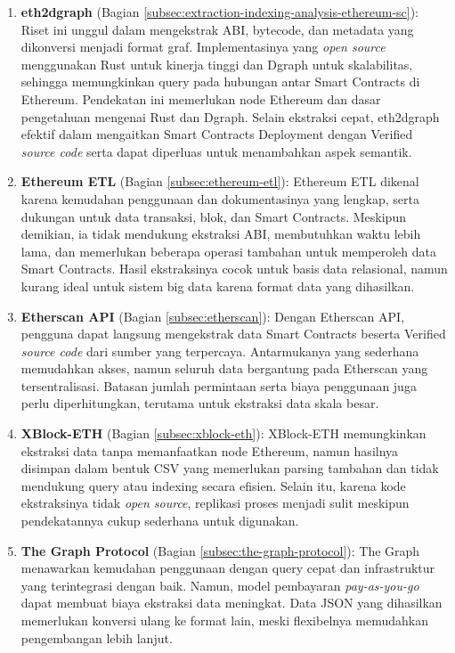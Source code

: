 \begin{enumerate}
	\item \textbf{eth2dgraph} \parencite{aimar2023extraction} (Bagian \ref{subsec:extraction-indexing-analysis-ethereum-sc}): Riset ini unggul dalam mengekstrak ABI, bytecode, dan metadata yang dikonversi menjadi format graf. Implementasinya yang \textit{open source} menggunakan Rust untuk kinerja tinggi dan Dgraph untuk skalabilitas, sehingga memungkinkan query pada hubungan antar Smart Contracts di Ethereum. Pendekatan ini memerlukan node Ethereum dan dasar pengetahuan mengenai Rust dan Dgraph. Selain ekstraksi cepat, eth2dgraph efektif dalam mengaitkan Smart Contracts Deployment dengan Verified \textit{source code} serta dapat diperluas untuk menambahkan aspek semantik.

	\item \textbf{Ethereum ETL} \parencite{ethereum_etl} (Bagian \ref{subsec:ethereum-etl}): Ethereum ETL dikenal karena kemudahan penggunaan dan dokumentasinya yang lengkap, serta dukungan untuk data transaksi, blok, dan Smart Contracts. Meskipun demikian, ia tidak mendukung ekstraksi ABI, membutuhkan waktu lebih lama, dan memerlukan beberapa operasi tambahan untuk memperoleh data Smart Contracts. Hasil ekstraksinya cocok untuk basis data relasional, namun kurang ideal untuk sistem big data karena format data yang dihasilkan.

	\item \textbf{Etherscan API} \parencite{etherscan2024} (Bagian \ref{subsec:etherscan}): Dengan Etherscan API, pengguna dapat langsung mengekstrak data Smart Contracts beserta Verified \textit{source code} dari sumber yang terpercaya. Antarmukanya yang sederhana memudahkan akses, namun seluruh data bergantung pada Etherscan yang tersentralisasi. Batasan jumlah permintaan serta biaya penggunaan juga perlu diperhitungkan, terutama untuk ekstraksi data skala besar.

	\item \textbf{XBlock-ETH} \parencite{zheng2020xblock} (Bagian \ref{subsec:xblock-eth}): XBlock-ETH memungkinkan ekstraksi data tanpa memanfaatkan node Ethereum, namun hasilnya disimpan dalam bentuk CSV yang memerlukan parsing tambahan dan tidak mendukung query atau indexing secara efisien. Selain itu, karena kode ekstraksinya tidak \textit{open source}, replikasi proses menjadi sulit meskipun pendekatannya cukup sederhana untuk digunakan.

	\item \textbf{The Graph Protocol} \parencite{TheGraphDocs} (Bagian \ref{subsec:the-graph-protocol}): The Graph menawarkan kemudahan penggunaan dengan query cepat dan infrastruktur yang terintegrasi dengan baik. Namun, model pembayaran \textit{pay-as-you-go} dapat membuat biaya ekstraksi data meningkat. Data JSON yang dihasilkan memerlukan konversi ulang ke format lain, meski flexibelnya memudahkan pengembangan lebih lanjut.


\end{enumerate}
